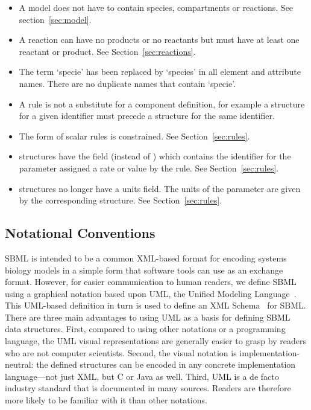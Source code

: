 \documentclass[10pt]{cekarticle}
\begin{document}
\begin{itemize}
\item A model does not have to contain species, compartments or reactions. See section~\ref{sec:model}.

\item A reaction can have no products or no reactants but must
have at least one reactant or product.  See
Section~\ref{sec:reactions}.

\item The term `specie' has been replaced by `species' in all
element and attribute names.  There are no duplicate names that
contain `specie'.

\item A rule is not a substitute for a component definition, for
example a  structure for a given identifier must
precede a  structure for the same identifier.

\item The form of scalar rules is constrained.  See
Section~\ref{sec:rules}.

\item {} structures have the field
 (instead of ) which contains the
identifier for the parameter assigned a rate or value by the rule.
 See Section~\ref{sec:rules}.

\item {} structures no longer have a units
field.  The units of the parameter are given by the corresponding
 structure.  See Section~\ref{sec:rules}.

\end{itemize}

\subsection{Notational Conventions}

SBML is intended to be a common XML-based format for encoding systems
biology models in a simple form that software tools can use as an exchange
format.  However, for easier communication to human readers, we define SBML
using a graphical notation based upon UML, the Unified Modeling
Language~\citep{eriksson:1998,oestereich:1999}.  This UML-based definition
in turn is used to define an XML
Schema~\citep{biron:2000,fallside:2000,thompson:2000} for SBML.  There are
three main advantages to using UML as a basis for defining SBML data
structures.  First, compared to using other notations or a programming
language, the UML visual representations are generally easier to grasp by
readers who are not computer scientists.  Second, the visual notation is
implementation-neutral: the defined structures can be encoded in any
concrete implementation language---not just XML, but C or Java as well.
Third, UML is a de facto industry standard that is documented in many
sources.  Readers are therefore more likely to be familiar with it than
other notations.
\end{document}
